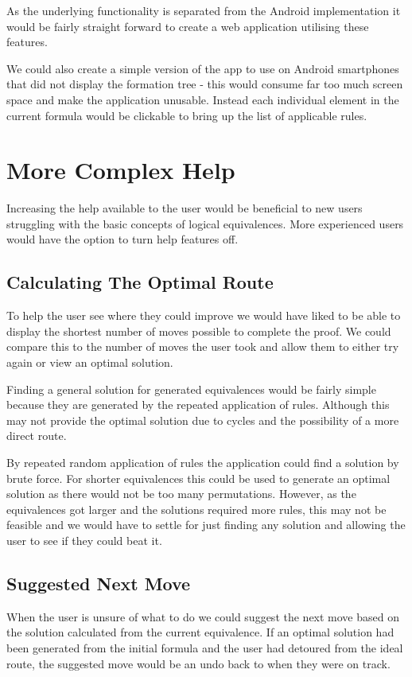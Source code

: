 \documentclass{report}
\begin{document}
As the underlying functionality is separated from the Android implementation it would be fairly straight forward to create a web application utilising these features. 

We could also create a simple version of the app to use on Android smartphones that did not display the formation tree - this would consume far too much screen space and make the application unusable. Instead each individual element in the current formula would be clickable to bring up the list of applicable rules. 

\section{More Complex Help}

Increasing the help available to the user would be beneficial to new users struggling with the basic concepts of logical equivalences. More experienced users would have the option to turn help features off.

\subsection{Calculating The Optimal Route}

To help the user see where they could improve we would have liked to be able to display the shortest number of moves possible to complete the proof. We could compare this to the number of moves the user took and allow them to either try again or view an optimal solution.

Finding a general solution for generated equivalences would be fairly simple because they are generated by the repeated application of rules. Although this may not provide the optimal solution due to cycles and the possibility of a more direct route.

By repeated random application of rules the application could find a solution by brute force. For shorter equivalences this could be used to generate an optimal solution as there would not be too many permutations. However, as the equivalences got larger and the solutions required more rules, this may not be feasible and we would have to settle for just finding any solution and allowing the user to see if they could beat it.

\subsection{Suggested Next Move}

When the user is unsure of what to do we could suggest the next move based on the solution calculated from the current equivalence. If an optimal solution had been generated from the initial formula and the user had detoured from the ideal route, the suggested move would be an undo back to when they were on track.
\end{document}
